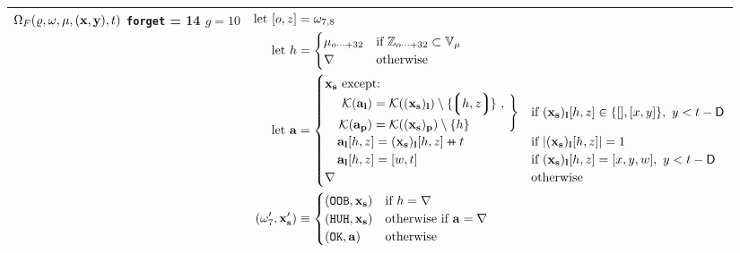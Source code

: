 \begin{longtable}{p{3.5cm} p{12.5cm}}
  \cmidrule(lr){1-1}\cmidrule(lr){2-2}
  \makecell*[l]{
  $\Omega_F(\varrho, \omega, \mu, (\mathbf{x}, \mathbf{y}), t)$ \\
  \texttt{forget} = 14 \\
  $g = 10$} &
  $\begin{aligned}
    \using [o, z] &= \registers_{7, 8} \\
    \using h &= \begin{cases}
      \memory_{o\dots+32} &\when \mathbb{Z}_{o \dots+ 32} \subset \mathbb{V}_{\memory} \\
      \error &\otherwise
    \end{cases} \\
    \using \mathbf{a} &= \begin{cases}
      \mathbf{x}_\mathbf{s} \text{ except:} &\\
      \quad \left.
        \begin{aligned}
          \keys{\mathbf{a}_\mathbf{l}} &= \keys{(\mathbf{x}_\mathbf{s})_\mathbf{l}} \setminus \{\tup{h, z}\}\ ,\\[2pt]
          \keys{\mathbf{a}_\mathbf{p}} &= \keys{(\mathbf{x}_\mathbf{s})_\mathbf{p}} \setminus \{h\}
        \end{aligned}
      \ \right\} &\when (\mathbf{x}_\mathbf{s})_\mathbf{l}[h, z] \in \{[], [x, y]\},\ y < t - \mathsf{D} \\
      \quad \mathbf{a}_\mathbf{l}[h, z] = (\mathbf{x}_\mathbf{s})_\mathbf{l}[h, z] \doubleplus t &\when |(\mathbf{x}_\mathbf{s})_\mathbf{l}[h, z]| = 1 \\
      \quad \mathbf{a}_\mathbf{l}[h, z] = [w, t] &\when (\mathbf{x}_\mathbf{s})_\mathbf{l}[h, z] = [x, y, w],\ y < t - \mathsf{D} \\
      \error &\otherwise\\
    \end{cases} \\
    (\registers'_7, \mathbf{x}'_\mathbf{s}) &\equiv \begin{cases}
      (\mathtt{OOB}, \mathbf{x}_\mathbf{s}) &\when h = \error \\
      (\mathtt{HUH}, \mathbf{x}_\mathbf{s}) &\otherwhen \mathbf{a} = \error \\
      (\mathtt{OK}, \mathbf{a}) &\otherwise \\
    \end{cases} \\
  \end{aligned}$\\
  \bottomrule
\end{longtable}

